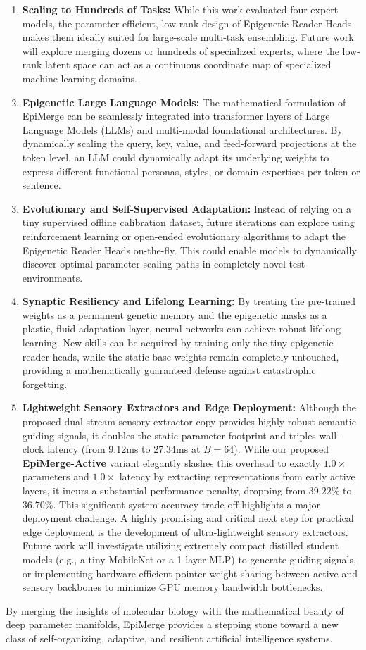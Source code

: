 \begin{enumerate}
    \item \textbf{Scaling to Hundreds of Tasks:} While this work evaluated four expert models, the parameter-efficient, low-rank design of Epigenetic Reader Heads makes them ideally suited for large-scale multi-task ensembling. Future work will explore merging dozens or hundreds of specialized experts, where the low-rank latent space can act as a continuous coordinate map of specialized machine learning domains.
    \item \textbf{Epigenetic Large Language Models:} The mathematical formulation of EpiMerge can be seamlessly integrated into transformer layers of Large Language Models (LLMs) and multi-modal foundational architectures. By dynamically scaling the query, key, value, and feed-forward projections at the token level, an LLM could dynamically adapt its underlying weights to express different functional personas, styles, or domain expertises per token or sentence.
    \item \textbf{Evolutionary and Self-Supervised Adaptation:} Instead of relying on a tiny supervised offline calibration dataset, future iterations can explore using reinforcement learning or open-ended evolutionary algorithms to adapt the Epigenetic Reader Heads on-the-fly. This could enable models to dynamically discover optimal parameter scaling paths in completely novel test environments.
    \item \textbf{Synaptic Resiliency and Lifelong Learning:} By treating the pre-trained weights as a permanent genetic memory and the epigenetic masks as a plastic, fluid adaptation layer, neural networks can achieve robust lifelong learning. New skills can be acquired by training only the tiny epigenetic reader heads, while the static base weights remain completely untouched, providing a mathematically guaranteed defense against catastrophic forgetting.
    \item \textbf{Lightweight Sensory Extractors and Edge Deployment:} Although the proposed dual-stream sensory extractor copy provides highly robust semantic guiding signals, it doubles the static parameter footprint and triples wall-clock latency (from 9.12ms to 27.34ms at $B=64$). While our proposed \textbf{EpiMerge-Active} variant elegantly slashes this overhead to exactly $1.0\times$ parameters and $1.0\times$ latency by extracting representations from early active layers, it incurs a substantial performance penalty, dropping from $39.22\%$ to $36.70\%$. This significant system-accuracy trade-off highlights a major deployment challenge. A highly promising and critical next step for practical edge deployment is the development of ultra-lightweight sensory extractors. Future work will investigate utilizing extremely compact distilled student models (e.g., a tiny MobileNet or a 1-layer MLP) to generate guiding signals, or implementing hardware-efficient pointer weight-sharing between active and sensory backbones to minimize GPU memory bandwidth bottlenecks.
\end{enumerate}

By merging the insights of molecular biology with the mathematical beauty of deep parameter manifolds, EpiMerge provides a stepping stone toward a new class of self-organizing, adaptive, and resilient artificial intelligence systems.

